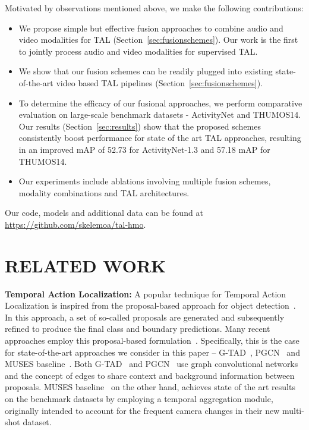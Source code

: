 \documentclass[10pt,twocolumn,letterpaper]{article}
\begin{document}
Motivated by observations mentioned above, we make the following contributions:
\begin{itemize}
    \item We propose simple but effective fusion approaches to combine audio and video modalities for TAL (Section~\ref{sec:fusionschemes}). Our work is the first to jointly process audio and video modalities for supervised TAL.
    \item We show that our fusion schemes can be readily plugged into existing state-of-the-art video based TAL pipelines (Section~\ref{sec:fusionschemes}).
    \item To determine the efficacy of our fusional approaches, we perform comparative evaluation on large-scale benchmark datasets - ActivityNet and THUMOS14. Our results (Section~\ref{sec:results}) show that the proposed schemes consistently boost performance for state of the art TAL approaches, resulting in an improved mAP of 52.73 for ActivityNet-1.3 and 57.18 mAP for THUMOS14.
    \item Our experiments include ablations involving multiple fusion schemes, modality combinations and TAL architectures. 
\end{itemize}

Our code, models and additional data can be found at \url{https://github.com/skelemoa/tal-hmo}.

\section{\uppercase{Related Work}}
\label{sec:related}

\noindent \textbf{Temporal Action Localization:} A popular technique for Temporal Action Localization is inspired from the proposal-based approach for object detection~\cite{girshick2015fast}. In this approach, a set of so-called proposals are generated and subsequently refined to produce the final class and boundary predictions. Many recent approaches employ this proposal-based formulation~\cite{DBLP:journals/corr/ShouWC16,DBLP:journals/corr/ZhaoXWWLT17,DBLP:journals/corr/XuDS17}. Specifically, this is the case for  state-of-the-art approaches we consider in this paper -- G-TAD~\cite{Xu_2020_CVPR}, PGCN~\cite{PGCN2019ICCV} and MUSES baseline~\cite{Liu_2021_CVPR}. Both G-TAD~\cite{Xu_2020_CVPR} and PGCN~\cite{PGCN2019ICCV} use graph convolutional networks and the concept of edges to share context and background information between proposals. MUSES baseline~\cite{Liu_2021_CVPR} on the other hand, achieves state of the art results on the benchmark datasets by employing a temporal aggregation module, originally intended to account for the frequent camera changes in their new multi-shot dataset. 
\end{document}
